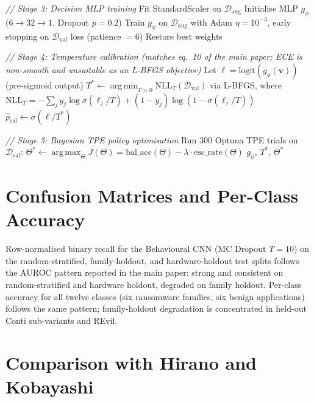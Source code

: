 \documentclass[journal]{IEEEtran}
\DeclareMathOperator*{\argmin}{arg\,min}
\DeclareMathOperator*{\argmax}{arg\,max}
\begin{document}
\begin{algorithm}[h]
\begin{algorithmic}[1]
\State \textit{// Stage 3: Decision MLP training}
\State Fit StandardScaler on $\mathcal{D}_{\text{aug}}$
\State Initialise MLP $g_\phi$ ($6{\to}32{\to}1$, Dropout $p{=}0.2$)
\State Train $g_\phi$ on $\mathcal{D}_{\text{aug}}$ with Adam $\eta{=}10^{-3}$,
  early stopping on $\mathcal{D}_{\text{val}}$ loss (patience $= 6$)
\State Restore best weights

\State \textit{// Stage 4: Temperature calibration (matches eq.~10 of the
  main paper; ECE is non-smooth and unsuitable as an L-BFGS objective)}
\State Let $\ell = \text{logit}(g_\phi(\mathbf{v}))$ (pre-sigmoid output)
\State $T^* \gets \argmin_{T>0} \text{NLL}_T(\mathcal{D}_{\text{val}})$ via
  L-BFGS, where $\text{NLL}_T = -\sum_j y_j \log \sigma(\ell_j/T) +
  (1{-}y_j)\log(1{-}\sigma(\ell_j/T))$
\State $\hat{p}_{\text{cal}} \gets \sigma(\ell/T^*)$

\State \textit{// Stage 5: Bayesian TPE policy optimisation}
\State Run $300$ Optuna TPE trials on $\mathcal{D}_{\text{cal}}$:
  $\Theta^* \gets \argmax_\Theta J(\Theta) = \text{bal\_acc}(\Theta)
  - \lambda \cdot \text{esc\_rate}(\Theta)$
\State \Return $g_\phi$, $T^*$, $\Theta^*$
\end{algorithmic}
\end{algorithm}

\section{Confusion Matrices and Per-Class Accuracy}\label{sec:supp_confusion}

Row-normalised binary recall for the Behavioural CNN (MC Dropout $T{=}10$)
on the random-stratified, family-holdout, and hardware-holdout test
splits follows the AUROC pattern reported in the main paper: strong and
consistent on random-stratified and hardware holdout, degraded on family
holdout. Per-class accuracy for all twelve classes (six ransomware
families, six benign applications) follows the same pattern;
family-holdout degradation is concentrated in held-out Conti
sub-variants and REvil.

\section{Comparison with Hirano and Kobayashi}\label{sec:supp_hirano}
\end{document}
